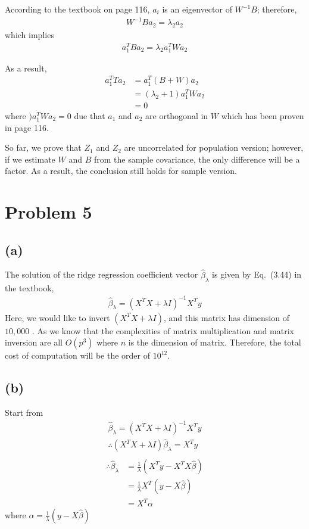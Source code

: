 \documentclass[pra,groupedaddress,amsmath,amssymb, column]{revtex4}
\begin{document}
According to the textbook on page 116, $a_i$ is an eigenvector of $W^{-1}B$; therefore,
\begin{align} W^{-1}Ba_2=\lambda_2a_2\end{align}
which implies
\begin{align} a_1^TBa_2=\lambda_2a_1^TWa_2\end{align}

As a result, 
\begin{align}
a_1^TTa_2&=a_1^T(B+W)a_2 \\
&=(\lambda_2+1)a_1^TWa_2\\
&=0
\end{align}
where $)a_1^TWa_2=0$ due that  $a_1$ and $a_2$ are orthogonal in $W$ which has been proven in page 116.

So far, we prove that $Z_1$ and $Z_2$ are uncorrelated for population version; however, if we estimate $W$ and $B$ from the sample covariance, the only difference will be a factor. As a result, the conclusion still holds for sample version.

\section*{Problem 5}
\subsection*{(a)}
The solution of the ridge regression coefficient vector $\hat{\beta}_\lambda$ is given by Eq.~(3.44) in the textbook,
\begin{align}
	\hat{\beta}_\lambda = (X^TX + \lambda I)^{-1}X^Ty
\end{align}
Here, we would like to invert $(X^TX + \lambda I)$, and this matrix has dimension of $10,000$ . As we know that the complexities of matrix multiplication	and matrix inversion are all $O(p^3)$ where $n$ is the dimension of matrix. Therefore, the total cost of computation will be the order of $10^{12}$.

\subsection*{(b)}
Start from
\begin{align}
	\hat{\beta}_\lambda = (X^TX + \lambda I)^{-1}X^Ty\\ \therefore	 (X^TX + \lambda I) \hat{\beta}_\lambda = X^Ty\\ 
	\end{align}
\begin{align}
  \therefore \hat{\beta}_\lambda& =\frac{1}{\lambda} (X^Ty  - X^TX \hat{\beta})\\
	&=\frac{1}{\lambda} X^T(y-X\hat{\beta})\\
	&=X^T\alpha
\end{align}
where $\alpha=\frac{1}{\lambda}(y-X\hat{\beta}) $ 
\end{document}
